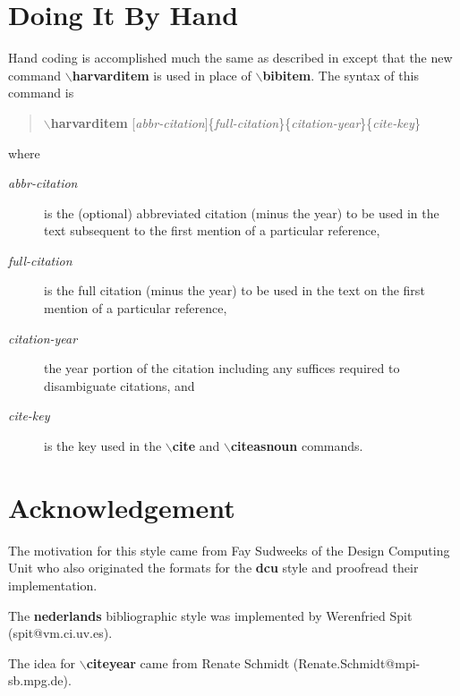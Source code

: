 \section{Doing It By Hand}
Hand coding is accomplished much the same as described in 
except that the new command {\bf $\backslash$harvarditem} is used in place
of {\bf $\backslash$bibitem}.
The syntax of this command is
\begin{quote}
{\bf $\backslash$harvarditem} [{\em abbr-citation}]\{{\em full-citation}\}\{{\em citation-year}\}\{{\em cite-key}\}
\end{quote}
where
\begin{description}
\item[{\em abbr-citation}] is the (optional) abbreviated citation
(minus the year) to be used in the text
subsequent to the first mention of a particular reference,
\item[{\em full-citation}] is the full citation (minus the year)
to be used in the text
on the first mention of a particular reference,
\item[{\em citation-year}] the year portion of the citation including any
suffices required to disambiguate citations, and
\item[{\em cite-key}] is the key used in the {\bf $\backslash$cite} and
{\bf $\backslash$citeasnoun} commands.
\end{description}

\section{Acknowledgement}
The motivation for this style came from Fay Sudweeks of the Design Computing
Unit who also originated the formats for the {\bf dcu} style and proofread
their implementation.

The {\bf nederlands} bibliographic style was implemented by Werenfried Spit
(spit@vm.ci.uv.es).

The idea for {\bf $\backslash$citeyear} came from Renate Schmidt
(Renate.Schmidt@mpi-sb.mpg.de).



